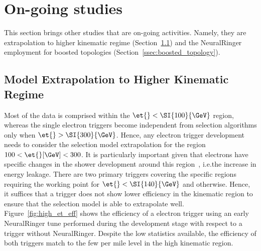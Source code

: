 \chapter{On-going studies}%
\label{sec:other_ana}


This section brings other studies that are on-going activities. Namely, they are
extrapolation to higher kinematic regime
(Section~\ref{ssec:kinematic_extrapolation}) and the NeuralRinger employment for
boosted topologies (Section~\ref{ssec:boosted_topology}).

\section{Model Extrapolation to Higher Kinematic Regime}%
\label{ssec:kinematic_extrapolation}


Most of the \Zee{} \tnp{} data is comprised within the $\et{}<\SI{100}{\GeV}$
region, whereas the single electron triggers become independent from
selection algorithms only when $\et{}>\SI{300}{\GeV}$. Hence, any electron trigger
development needs to consider the selection model extrapolation for the region
$100<\et{} [\text{\GeV}]<300$. It is particularly important given that electrons
have specific changes in the shower development around this
region~\cite{atlas_electron_id_offline}, i.e.\@ the increase in \emiii{} energy
leakage. There are two primary triggers covering the specific regions requiring
the \medium{} working point for $\et{}<\SI{140}{\GeV}$ and \vloose{} otherwise.
Hence, it suffices that a \medium{} trigger does not show lower efficiency in
the kinematic region to ensure that the selection model is able to extrapolate
well. Figure~\ref{fig:high_et_eff} shows the efficiency of a \medium{} electron
trigger using an early NeuralRinger tune performed during the development stage with
respect to a trigger without NeuralRinger. Despite the low statistics available, the
efficiency of both triggers match to the few per mile level in the high
kinematic region.





